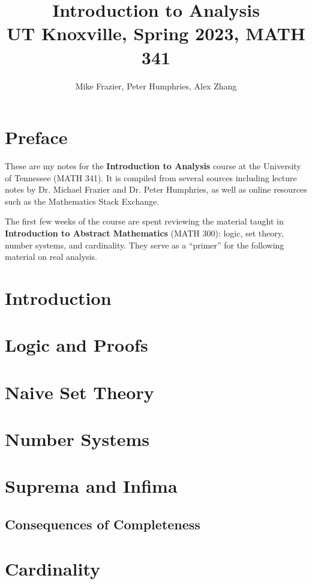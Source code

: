 \documentclass[12pt]{report}
\title{\textbf{Introduction to Analysis}\\
\large UT Knoxville, Spring 2023, MATH 341}
\author{Mike Frazier, Peter Humphries, Alex Zhang}
\begin{document}
\maketitle
\tableofcontents

\chapter*{Preface}
These are my notes for the \textbf{Introduction to Analysis} course at the University of Tennessee (MATH 341). It is compiled from several sources including lecture notes by Dr. Michael Frazier and Dr. Peter Humphries, as well as online resources such as the Mathematics Stack Exchange.


The first few weeks of the course are spent reviewing the material taught in \textbf{Introduction to Abstract Mathematics} (MATH 300): logic, set theory, number systems, and cardinality. They serve as a ``primer'' for the following material on real analysis.

\chapter{Introduction}


\chapter{Logic and Proofs}


\chapter{Naive Set Theory}


\chapter{Number Systems}


\chapter{Suprema and Infima}

\section{Consequences of Completeness}


\chapter{Cardinality}


\amzindex
\end{document}

